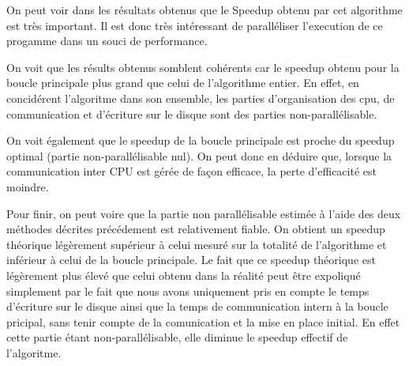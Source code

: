\documentclass[12pt,a4paper,oneside, titlepage]{report}
\begin{document}
	On peut voir dans les résultats obtenus que le Speedup obtenu par cet algorithme est très important.
	Il est donc très intéressant de paralléliser l'execution de ce progamme dans un souci de performance.

	On voit que les résults obtenus somblent cohérents car le speedup obtenu pour la boucle principale plus grand que celui de l'algorithme entier.
	En effet, en concidérent l'algoritme dans son ensemble, les parties d'organisation des cpu, de communication et d'écriture sur le disque sont des parties non-parallélisable.

	On voit également  que le speedup de la boucle principale est proche du speedup optimal (partie non-parallélisable nul).
	On peut donc en déduire que, lorsque la communication inter CPU est gérée de façon efficace, la perte d'efficacité est moindre.

	Pour finir, on peut voire que la partie non parallélisable estimée à l'aide des deux méthodes décrites précédement est relativement fiable.
	On obtient un speedup théorique légèrement supérieur à celui mesuré sur la totalité de l'algorithme et inférieur à celui de la boucle principale.
	Le fait que ce speedup théorique est légèrement plus élevé que celui obtenu dans la réalité peut être expoliqué simplement par le fait que nous avons uniquement pris en compte le temps d'écriture sur le disque ainsi que la temps de communication intern à la boucle pricipal, sans tenir compte de la comunication et la mise en place initial.
	En effet cette partie étant non-parallélisable, elle diminue le speedup effectif de l'algoritme.
\end{document}
